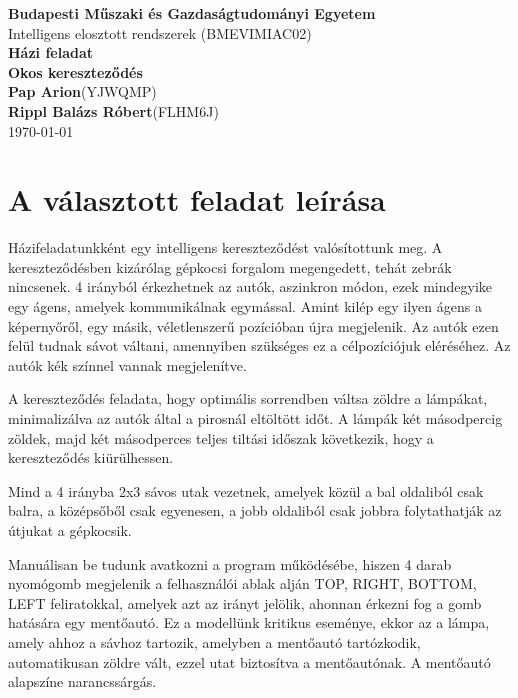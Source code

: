 \documentclass[a4paper, 11pt]{article}
\begin{document}
\begin{titlepage}

    \begin{center}
        \vspace{0.3cm}
        \textbf{Budapesti Műszaki és Gazdaságtudományi Egyetem}\\
        \textmd{Intelligens elosztott rendszerek (BMEVIMIAC02)}\\[5cm]

        {\huge \bfseries Házi feladat }\\[0.8cm]
        {\huge \bfseries Okos kereszteződés }\\[0.8cm]
        \vspace{5.5cm}
        \Large \textbf{Pap Arion}(YJWQMP)\\
        \Large \textbf{Rippl Balázs Róbert}(FLHM6J)\\

        \vspace{1cm}
        \textsc{\Large \today}\\

    \end{center}
\end{titlepage}
\tableofcontents
\newpage

\section{A választott feladat leírása}
Házifeladatunkként egy intelligens kereszteződést valósítottunk meg.
A kereszteződésben kizárólag gépkocsi forgalom megengedett, tehát zebrák nincsenek.
4 irányból érkezhetnek az autók, aszinkron módon, ezek mindegyike egy ágens,
amelyek kommunikálnak egymással. Amint kilép egy ilyen ágens a képernyőről, egy másik,
véletlenszerű pozícióban újra megjelenik. Az autók ezen felül tudnak sávot váltani,
amennyiben szükséges ez a célpozíciójuk eléréséhez. Az autók kék színnel vannak megjelenítve.

A kereszteződés feladata, hogy optimális sorrendben váltsa zöldre a lámpákat, minimalizálva
az autók által a pirosnál eltöltött időt. A lámpák két másodpercig zöldek, majd két másodperces
teljes tiltási időszak következik, hogy a kereszteződés kiürülhessen.

Mind a 4 irányba 2x3 sávos utak vezetnek, amelyek közül
a bal oldaliból csak balra, a középsőből csak egyenesen, a jobb oldaliból csak jobbra folytathatják
az útjukat a gépkocsik.

Manuálisan be tudunk avatkozni a program működésébe,
hiszen 4 darab nyomógomb megjelenik a felhasználói ablak alján TOP, RIGHT, BOTTOM, LEFT feliratokkal,
amelyek azt az irányt jelölik, ahonnan érkezni fog a gomb hatására egy mentőautó.
Ez a modellünk kritikus eseménye, ekkor az a lámpa, amely ahhoz a sávhoz tartozik,
amelyben a mentőautó tartózkodik, automatikusan zöldre vált, ezzel utat biztosítva a mentőautónak.
A mentőautó alapszíne narancssárgás.
\end{document}

